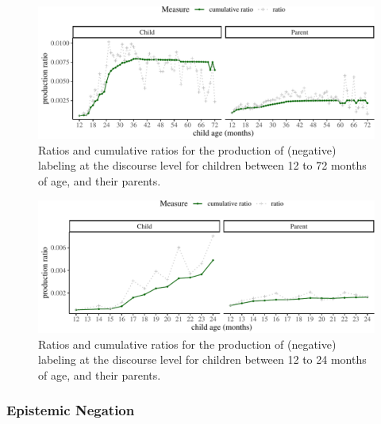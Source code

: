 \documentclass[
  english,
  man,floatsintext]{apa6}
\begin{document}
\begin{figure}[H]

{\centering \includegraphics{neg_construction_article_files/figure-latex/learningdiscourse-1} 

}

\caption{Ratios and cumulative ratios for the production of (negative) labeling at the discourse level for children between 12 to 72 months of age, and their parents.}\label{fig:learningdiscourse}
\end{figure}

\begin{figure}[H]

{\centering \includegraphics{neg_construction_article_files/figure-latex/learningdiscoursebegin-1} 

}

\caption{Ratios and cumulative ratios for the production of (negative) labeling at the discourse level for children between 12 to 24 months of age, and their parents.}\label{fig:learningdiscoursebegin}
\end{figure}

\hypertarget{epistemic-negation}{%
\subsubsection{Epistemic Negation}\label{epistemic-negation}}
\end{document}
